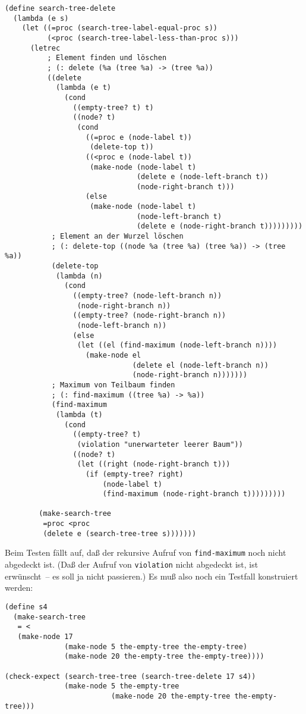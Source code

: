 \begin{verbatim}
(define search-tree-delete
  (lambda (e s)
    (let ((=proc (search-tree-label-equal-proc s))
          (<proc (search-tree-label-less-than-proc s)))
      (letrec
          ; Element finden und löschen
          ; (: delete (%a (tree %a) -> (tree %a))
          ((delete
            (lambda (e t)
              (cond
                ((empty-tree? t) t)
                ((node? t)
                 (cond
                   ((=proc e (node-label t))
                    (delete-top t))
                   ((<proc e (node-label t))
                    (make-node (node-label t)
                               (delete e (node-left-branch t))
                               (node-right-branch t)))
                   (else
                    (make-node (node-label t)
                               (node-left-branch t)
                               (delete e (node-right-branch t)))))))))
           ; Element an der Wurzel löschen
           ; (: delete-top ((node %a (tree %a) (tree %a)) -> (tree %a))
           (delete-top
            (lambda (n)
              (cond
                ((empty-tree? (node-left-branch n))
                 (node-right-branch n))
                ((empty-tree? (node-right-branch n))
                 (node-left-branch n))
                (else
                 (let ((el (find-maximum (node-left-branch n))))
                   (make-node el
                              (delete el (node-left-branch n))
                              (node-right-branch n)))))))
           ; Maximum von Teilbaum finden
           ; (: find-maximum ((tree %a) -> %a))
           (find-maximum
            (lambda (t)
              (cond
                ((empty-tree? t)
                 (violation "unerwarteter leerer Baum"))
                ((node? t)
                 (let ((right (node-right-branch t)))
                   (if (empty-tree? right)
                       (node-label t)
                       (find-maximum (node-right-branch t)))))))))
           
        (make-search-tree
         =proc <proc
         (delete e (search-tree-tree s)))))))
\end{verbatim}
%
Beim Testen fällt auf, daß der rekursive Aufruf von
\texttt{find-maximum} noch nicht abgedeckt ist.  (Daß der Aufruf von
\texttt{violation} nicht abgedeckt ist, ist erwünscht~-- es soll ja
nicht passieren.)  Es muß also noch ein Testfall konstruiert werden:
%
\begin{verbatim}
(define s4
  (make-search-tree
   = <
   (make-node 17
              (make-node 5 the-empty-tree the-empty-tree)
              (make-node 20 the-empty-tree the-empty-tree))))

(check-expect (search-tree-tree (search-tree-delete 17 s4))
              (make-node 5 the-empty-tree
                         (make-node 20 the-empty-tree the-empty-tree)))
\end{verbatim}
%

